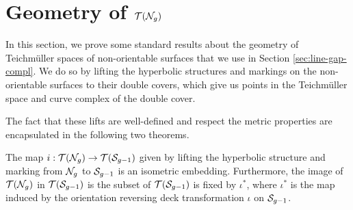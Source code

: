 \documentclass[12pt, reqno]{amsart}
\begin{document}



\appendix

\section{Geometry of $\mathcal{T}(\mathcal{N}_g)$}
\label{sec:geom-of-teich}

In this section, we prove some standard results about the geometry of Teichmüller spaces of non-orientable surfaces that we use in Section \ref{sec:line-gap-compl}.
We do so by lifting the hyperbolic structures and markings on the non-orientable surfaces to their double covers, which give us points in the Teichmüller space and curve complex of the double cover.

The fact that these lifts are well-defined and respect the metric properties are encapsulated in the following two theorems.

\begin{theorem}
  \label{thm:i-embedding-teich-space}
  The map $i : \mathcal{T}(\mathcal{N}_g) \to \mathcal{T}(\mathcal{S}_{g-1})$ given by lifting the hyperbolic structure and marking from $\mathcal{N}_g$ to $\mathcal{S}_{g-1}$ is an isometric embedding.
  Furthermore, the image of $\mathcal{T}(\mathcal{N}_g)$ in $\mathcal{T}(\mathcal{S}_{g-1})$ is the subset of $\mathcal{T}(\mathcal{S}_{g-1})$ is fixed by $\iota^{\ast}$, where $\iota^{\ast}$ is the map induced by the orientation reversing deck transformation $\iota$ on $\mathcal{S}_{g-1}$.
\end{theorem}
\end{document}
